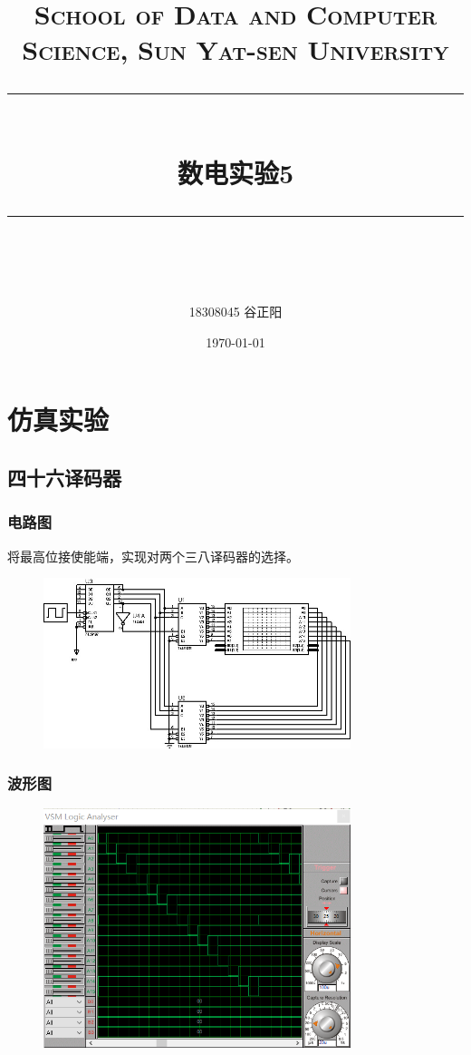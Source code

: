 \documentclass[UTF8, a4paper, 11pt]{article}
\title{	
\normalfont \normalsize
\textsc{School of Data and Computer Science, Sun Yat-sen University} \\ [25pt] %
\rule{\textwidth}{0.5pt} \\[0.4cm] %
\huge 数电实验5\\ %
\rule{\textwidth}{2pt} \\[0.5cm] %
\author{18308045 谷正阳}
\date{\normalsize\today}
}
\begin{document}
\maketitle
\tableofcontents
\newpage
\section{仿真实验}
\subsection{四十六译码器}
\subsubsection{电路图}
将最高位接使能端，实现对两个三八译码器的选择。
\begin{figure}[H]
    \centering
    \includegraphics[width=0.8\textwidth]{ex5.1电路图.jpg}
\end{figure}
\subsubsection{波形图}
\begin{figure}[H]
    \centering
    \includegraphics[width=0.8\textwidth]{ex5.1波形图.png}
\end{figure}
\end{document}
